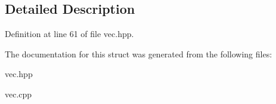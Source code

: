 \subsection{Detailed Description}


Definition at line 61 of file vec.\-hpp.



The documentation for this struct was generated from the following files\-:\begin{DoxyCompactItemize}
\item 
vec.\-hpp\item 
vec.\-cpp\end{DoxyCompactItemize}

